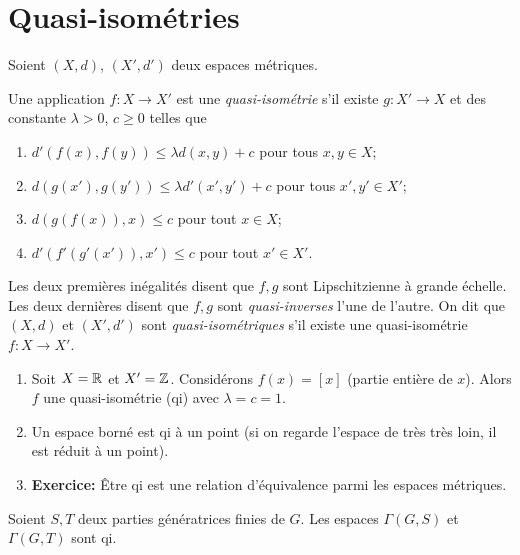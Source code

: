   \section{Quasi-isométries}
  \label{sec:quasi-isometries}

  
  Soient $(X, d)$, $(X', d')$ deux espaces métriques.

  \begin{defi}
    Une application $f: X \to X'$ est une \emph{quasi-isométrie}  s'il existe $g: X' \to
    X$ et des constante $\lambda >0$, $c \geq 0$ telles que
    \begin{enumerate}
    \item $d'(f(x), f(y)) \leq \lambda d(x,y) + c$ pour tous $x, y \in X$;
    \item $d(g(x'), g(y')) \leq \lambda d'(x', y') + c$ pour tous $x', y' \in X'$;
    \item $d(g(f(x)), x) \leq c$ pour tout $x \in X$;
    \item $d'(f'(g'(x')), x') \leq c$ pour tout $x' \in X'$.
    \end{enumerate}
    Les deux premières inégalités disent que $f, g$ sont Lipschitzienne à grande échelle. Les deux dernières
    disent que $f, g$ sont \emph{quasi-inverses}  l'une de l'autre.
    On dit que $(X, d)$ et $(X', d')$ sont \emph{quasi-isométriques}  s'il
    existe une quasi-isométrie $f: X \to X'$.
  \end{defi}


  \begin{exs}
    \begin{enumerate}
    \item Soit $X = \mathbb{R}$ et $X' = \mathbb{Z}$. Considérons $f(x) = [x]$ (partie entière de $x$). Alors $f$ une
      quasi-isométrie (qi) avec $\lambda = c = 1$.

    \item Un espace borné est qi à un point (si on regarde l'espace de très très loin, il est réduit à un
      point).
    \item \textbf{Exercice:} Être qi est une relation d'équivalence parmi les espaces métriques.
    \end{enumerate}
  \end{exs}


  \begin{prop}
    Soient $S, T$ deux parties génératrices finies de $G$. Les espaces $\Gamma(G, S)$ et $\Gamma(G, T)$ sont qi.
  \end{prop}

